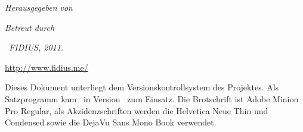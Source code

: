 \documentclass{thesis}
\author{}
\title{}
\subtitle{Diplomarbeit}
\begin{document}
\cleardoublepage
\pagestyle{fancy}
\maketitle

\clearpage
\thispagestyle{empty}\small
\textit{Herausgegeben von}

\textit{Betreut durch}


\vfill

\textit{\textcopyright\ FIDIUS, 2011.}

\url{http://www.fidius.me/}

Dieses Dokument unterliegt dem Versionskontrollsystem des Projektes. Als
Satzprogramm kam \XeTeX\ in Version \the\XeTeXversion\XeTeXrevision\ zum
Einsatz. Die Brotschrift ist Adobe Minion Pro Regular, als Akzidenzschriften
werden die Helvetica Neue Thin und Condensed sowie die DejaVu Sans Mono Book
verwendet.

\normalsize
\frontmatter
\shorttoc

\cleardoublepage
{}
{}
\tableofcontents


\cleardoublepage

\mainmatter




\appendix

\end{document}
